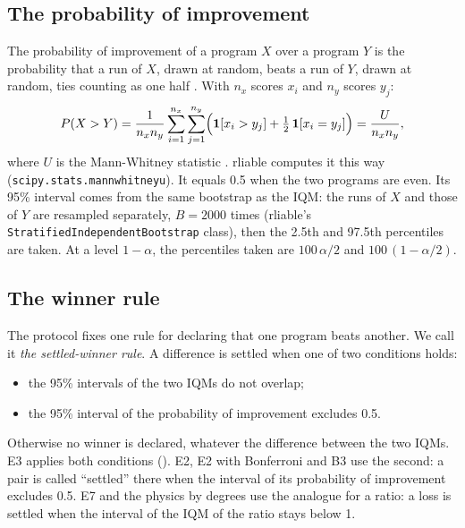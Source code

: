 \subsection{The probability of improvement}\label{sec:poi}
The probability of improvement of a program $X$ over a program $Y$ is the probability that a run of $X$, drawn
at random, beats a run of $Y$, drawn at random, ties counting as one half \parencite{agarwal2021precipice}.
With $n_x$ scores $x_i$ and $n_y$ scores $y_j$:
\begin{equation}\label{eq:poi}
  P(X>Y) = \frac{1}{n_x n_y}\sum_{i=1}^{n_x}\sum_{j=1}^{n_y}
  \Bigl(\mathbf{1}[x_i>y_j] + \tfrac12\,\mathbf{1}[x_i=y_j]\Bigr) = \frac{U}{n_x n_y},
\end{equation}
where $U$ is the Mann-Whitney statistic \parencite{mann1947test}. rliable computes it this way
(\texttt{scipy.stats.mannwhitneyu}). It equals 0.5 when the two programs are even. Its 95\% interval comes from
the same bootstrap as the IQM: the runs of $X$ and those of $Y$ are resampled separately, $B=\num{2000}$ times
(rliable's \texttt{StratifiedIndependentBootstrap} class), then the 2.5th and 97.5th percentiles are taken. At a
level $1-\alpha$, the percentiles taken are $100\,\alpha/2$ and $100\,(1-\alpha/2)$.

\subsection{The winner rule}\label{sec:regle}
The protocol fixes one rule for declaring that one program beats another. We call it \emph{the
settled-winner rule}. A difference is settled when one of two conditions holds:
\begin{itemize}
  \item the 95\% intervals of the two IQMs do not overlap;
  \item the 95\% interval of the probability of improvement excludes 0.5.
\end{itemize}
Otherwise no winner is declared, whatever the difference between the two IQMs. E3 applies both conditions
(). E2, E2 with Bonferroni and B3 use the second: a pair is called \enquote{settled} there when the
interval of its probability of improvement excludes 0.5. E7 and the physics by degrees use the analogue for a
ratio: a loss is settled when the interval of the IQM of the ratio stays below 1.

